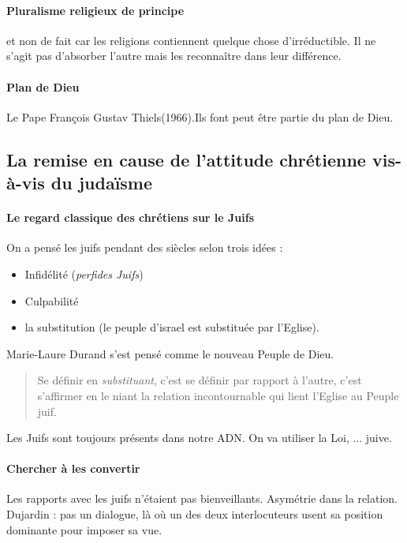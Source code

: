 \paragraph{Pluralisme religieux de principe} et non de fait car les religions contiennent quelque chose d'irréductible. Il ne s'agit pas d'absorber l'autre mais les reconnaître dans leur différence. 

\paragraph{Plan de Dieu} Le Pape François Gustav Thiels(1966).Ils font peut être partie du plan de Dieu.

  
  \subsection{La remise en cause de l'attitude chrétienne vis-à-vis du
  judaïsme}
  

  
  
  
    
    \paragraph{Le regard classique des chrétiens sur le Juifs}
    On a pensé les juifs pendant des siècles selon trois idées : 
    \begin{itemize}
        \item Infidélité (\textit{perfides Juifs})
        \item Culpabilité
        \item la substitution (le peuple d'israel est substituée par l'Eglise).
    \end{itemize}
  Marie-Laure Durand s'est pensé comme le nouveau Peuple de Dieu.
  \begin{quote}
      Se définir en \textit{substituant}, c'est se définir par rapport à l'autre, c'est s'affirmer en le niant la relation incontournable qui lient l'Eglise au Peuple juif. 
  \end{quote}
    Les Juifs sont toujours présents dans notre ADN. On va utiliser la Loi, ... juive.
    
    \paragraph{Chercher à les convertir} Les rapports avec les juifs n'étaient pas bienveillants.  Asymétrie dans la relation. 
    Dujardin : pas un dialogue, là où un des deux interlocuteurs usent sa position dominante pour imposer sa vue.
    
